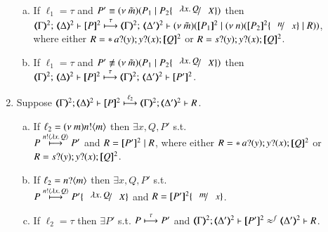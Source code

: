 \begin{proposition}
\begin{enumerate}[1.]
\begin{enumerate}[a)]
		\item	 
			If  
			$\ell_1 = \tau$ and $P' 	\scong \news{\tilde{m}}(P_1 \Par P_2\subst{\abs{x}Q}{X})$
			then \\
			$\mapt{\Gamma}^{2};\, \mapt{\Delta}^{2} \proves  \map{P}^{2}
			\hby{\tau}
			\mapt{\Gamma}^{2};\, \mapt{\Delta'}^{2} \proves  \news{\tilde{m}}(\map{P_1}^{2} \Par \news{n}
			(\map{P_2}^{2}\subst{n}{x} \Par R))$, \\
			where 
			either
			$R = \ast\,{} a ? (y) ; y ? (x) ; [\!\![Q]\!\!]^{2}$ 
			or $R = s ? (y) ; y ? (x) ; [\!\![Q]\!\!]^{2}$.


		\item	 
			If  
			$\ell_1 = \tau$ and $P' 	\not \scong \news{\tilde{m}}(P_1 \Par P_2\subst{\abs{x}Q}{X})$
			then \\
			$\mapt{\Gamma}^{2};\, \mapt{\Delta}^{2} \proves  \map{P}^{2}
			\hby{\tau}
			\mapt{\Gamma}^{2};\, \mapt{\Delta'}^{2} \proves  \map{P'}^{2}$.
			
				   			   
		\end{enumerate}
		\item Suppose 
		$\stytra{\mapt{\Gamma}^{2}}{\ell_2}{\mapt{\Delta}^{2}}{\map{P}^{2}}{\mapt{\Delta'}^{2}}{R}$.
		\begin{enumerate}[a)]
		\item
			If  
			$\ell_2 = (\nu\ m)n ! \langle m \rangle$
			then $\exists x, Q, P'$ s.t. \\
			$P \stackrel{n ! \langle \lambda x.\,Q \rangle}{\longmapsto} P'$
			and $R = [\!\![P']\!\!]^{2} \;|\; R$, where 
			either
			$R = \ast\,{} a ? (y) ; y ? (x) ; [\!\![Q]\!\!]^{2}$ 
			or $R = s ? (y) ; y ? (x) ; [\!\![Q]\!\!]^{2}$.

		\item   
			If  $\ell_2 = n ? \langle m \rangle$ 
			then $\exists x, Q, P'$ s.t. \\
			$P \hby{\bactout{n}{\abs{x}Q}} P'\subst{\abs{x}Q}{X}$
			and $R = \map{P'}^{2}\subst{m}{x}$.
		
		\item   
			If  %
			$\ell_2 = \tau$ 
			then $\exists P'$ s.t.
			$P \stackrel{\tau}{\longmapsto} P'$
			and $\horel{\mapt{\Gamma}^{2}}{\mapt{\Delta'}^{2}}{\map{P'}^{2}}{\wbf}{\mapt{\Delta'}^{2}}{R}$.
	\end{enumerate}
	\end{enumerate}
\end{proposition}

